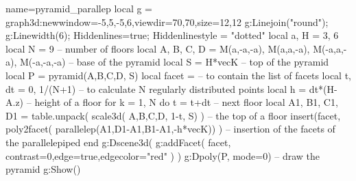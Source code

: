 \documentclass[12pt]{standalone}
\begin{document}
\begin{luadraw}{name=pyramid_parallep}
local g = graph3d:new{window={-5,5,-5,6},viewdir={70,70},size={12,12}}
g:Linejoin("round"); g:Linewidth(6); Hiddenlines=true; Hiddenlinestyle = "dotted"
local a, H = 3, 6
local N = 9 -- number of floors
local A, B, C, D = M(a,-a,-a), M(a,a,-a), M(-a,a,-a), M(-a,-a,-a) -- base of the pyramid
local S = H*vecK -- top of the pyramid
local P = pyramid({A,B,C,D}, S)
local facet = {} -- to contain the list of facets
local t, dt = 0, 1/(N+1) -- to calculate N regularly distributed points
local h = dt*(H-A.z) -- height of a floor
for k = 1, N do
    t = t+dt -- next floor
    local A1, B1, C1, D1 = table.unpack( scale3d( {A,B,C,D}, 1-t, S) ) -- the top of a floor
    insert(facet, poly2facet( parallelep(A1,D1-A1,B1-A1,-h*vecK)) ) -- insertion of the facets of the parallelepiped
end
g:Dscene3d( g:addFacet( facet, {contrast=0,edge=true,edgecolor="red"} ) )
g:Dpoly(P, {mode=0}) -- draw the pyramid
g:Show()
\end{luadraw}
\end{document}
